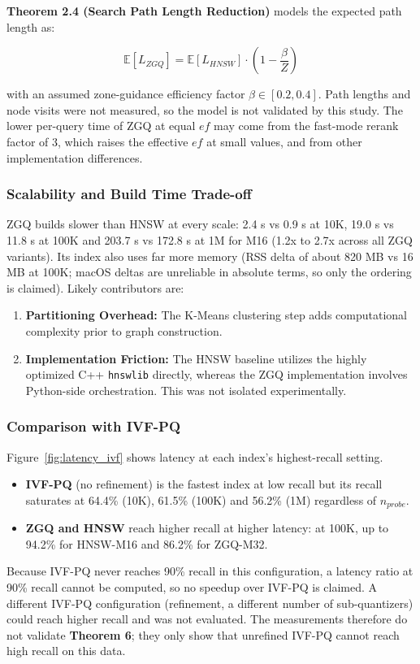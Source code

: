 \documentclass[conference]{IEEEtran}
\begin{document}
\textbf{Theorem 2.4 (Search Path Length Reduction)} models the expected path length as:

\begin{equation}
\mathbb{E}[L_{ZGQ}] = \mathbb{E}[L_{HNSW}] \cdot \left(1 - \frac{\beta}{Z}\right)
\end{equation}

with an assumed zone-guidance efficiency factor $\beta \in [0.2, 0.4]$. Path lengths and node visits were not measured, so the model is not validated by this study. The lower per-query time of ZGQ at equal $ef$ may come from the fast-mode rerank factor of 3, which raises the effective $ef$ at small values, and from other implementation differences.

\subsubsection{Scalability and Build Time Trade-off}
ZGQ builds slower than HNSW at every scale: 2.4 s vs 0.9 s at 10K, 19.0 s vs 11.8 s at 100K and 203.7 s vs 172.8 s at 1M for M16 (1.2x to 2.7x across all ZGQ variants). Its index also uses far more memory (RSS delta of about 820 MB vs 16 MB at 100K; macOS deltas are unreliable in absolute terms, so only the ordering is claimed). Likely contributors are:
\begin{enumerate}
    \item \textbf{Partitioning Overhead:} The K-Means clustering step adds computational complexity prior to graph construction.
    \item \textbf{Implementation Friction:} The HNSW baseline utilizes the highly optimized C++ \texttt{hnswlib} directly, whereas the ZGQ implementation involves Python-side orchestration. This was not isolated experimentally.
\end{enumerate}

\subsubsection{Comparison with IVF-PQ}
Figure~\ref{fig:latency_ivf} shows latency at each index's highest-recall setting.
\begin{itemize}
    \item \textbf{IVF-PQ} (no refinement) is the fastest index at low recall but its recall saturates at 64.4\% (10K), 61.5\% (100K) and 56.2\% (1M) regardless of $n_{probe}$.
    \item \textbf{ZGQ and HNSW} reach higher recall at higher latency: at 100K, up to 94.2\% for HNSW-M16 and 86.2\% for ZGQ-M32.
\end{itemize}
Because IVF-PQ never reaches 90\% recall in this configuration, a latency ratio at 90\% recall cannot be computed, so no speedup over IVF-PQ is claimed. A different IVF-PQ configuration (refinement, a different number of sub-quantizers) could reach higher recall and was not evaluated. The measurements therefore do not validate \textbf{Theorem 6}; they only show that unrefined IVF-PQ cannot reach high recall on this data.
\end{document}

